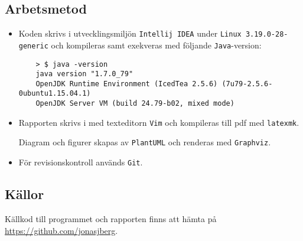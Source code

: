 \subsection*{Arbetsmetod}
\begin{itemize}
    \item Koden skrivs i utvecklingsmiljön \texttt{Intellij IDEA} under
    \texttt{Linux 3.19.0-28-generic} och kompileras samt exekveras med följande
    \texttt{Java}-version:
    \begin{verbatim}
    > $ java -version
    java version "1.7.0_79"
    OpenJDK Runtime Environment (IcedTea 2.5.6) (7u79-2.5.6-0ubuntu1.15.04.1)
    OpenJDK Server VM (build 24.79-b02, mixed mode)
    \end{verbatim}

    \item Rapporten skrivs i \latex med texteditorn \texttt{Vim} och kompileras
    till pdf med \texttt{latexmk}.
    \par Diagram och figurer skapas av \texttt{PlantUML} och renderas med
    \texttt{Graphviz}.

    \item För revisionskontroll används \texttt{Git}.
\end{itemize}

\subsection*{Källor}
\par Källkod till programmet och rapporten finns att hämta på \url{https://github.com/jonasjberg}.
